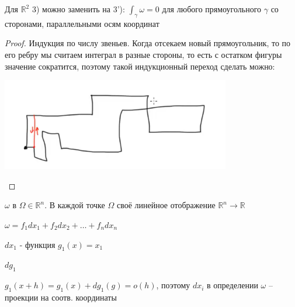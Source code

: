 \begin{remark}
    Для $\mathbb{R}^2$ 3) можно заменить на 3'): $\int_{\gamma}^{}\omega = 0$ для любого прямоугольного $\gamma$ со сторонами, параллельными осям координат
\end{remark}

\begin{proof}
    Индукция по числу звеньев. Когда отсекаем новый прямоугольник, то по его ребру мы считаем интеграл в разные стороны, то есть с остатком фигуры значение сократится, поэтому такой индукционный переход сделать можно:

    \begin{center}
        \includegraphics[width=10cm]{assets/03-intergrals-with-params/remark-parallel-sides.png}
    \end{center}
\end{proof}

\begin{remark}
    $\omega$ в $\Omega \in \mathbb{R}^n$. В каждой точке $\Omega$ своё линейное отображение $\mathbb{R}^n \to \mathbb{R}$

    $\omega = f_1dx_1 + f_2dx_2 + \dots + f_ndx_n$

    $dx_1$ - функция $g_1(x) = x_1$

    $dg_1$

    $g_1(x + h) = g_1(x) + dg_1(g) = o(h)$, поэтому $dx_i$ в определении $\omega$ -- проекции на соотв. координаты
\end{remark}


